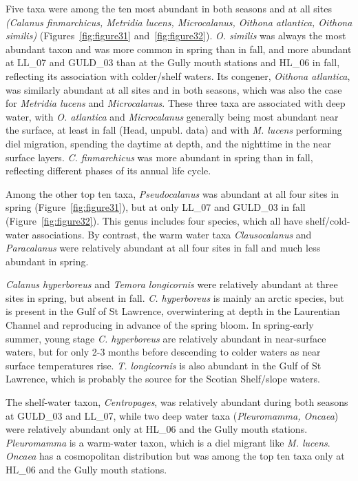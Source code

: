 \documentclass[12pt]{article}\usepackage[]{graphicx}\usepackage[]{color}
\begin{document}
Five taxa were among the ten most abundant in both seasons and at all sites \emph{(Calanus finmarchicus, Metridia lucens, Microcalanus, Oithona atlantica, Oithona similis)} (Figures~\ref{fig:figure31} and~\ref{fig:figure32}). \emph{O. similis} was always the most abundant taxon and was more common in spring than in fall, and more abundant at LL\_07 and GULD\_03 than at the Gully mouth stations and HL\_06 in fall, reflecting its association with colder/shelf waters. Its congener, \emph{Oithona atlantica}, was similarly abundant at all sites and in both seasons, which was also the case for \emph{Metridia lucens} and \emph{Microcalanus}. These three taxa are associated with deep water, with \emph{O. atlantica} and \emph{Microcalanus} generally being most abundant near the surface, at least in fall (Head, unpubl. data) and with \emph{M. lucens} performing diel migration, spending the daytime at depth, and the nighttime in the near surface layers. \emph{C. finmarchicus} was more abundant in spring than in fall, reflecting different phases of its annual life cycle.

Among the other top ten taxa, \emph{Pseudocalanus} was abundant at all four sites in spring (Figure~\ref{fig:figure31}), but at only LL\_07 and GULD\_03 in fall (Figure~\ref{fig:figure32}). This genus includes four species, which all have shelf/cold-water associations. By contrast, the warm water taxa \emph{Clausocalanus} and \emph{Paracalanus} were relatively abundant at all four sites in fall and much less abundant in spring.

\emph{Calanus hyperboreus} and \emph{Temora longicornis} were relatively abundant at three sites in spring, but absent in fall. \emph{C. hyperboreus} is mainly an arctic species, but is present in the Gulf of St Lawrence, overwintering at depth in the Laurentian Channel and reproducing in advance of the spring bloom. In spring-early summer, young stage \emph{C. hyperboreus} are relatively abundant in near-surface waters, but for only 2-3 months before descending to colder waters as near surface temperatures rise. \emph{T. longicornis} is also abundant in the Gulf of St Lawrence, which is probably the source for the Scotian Shelf/slope waters.

The shelf-water taxon, \emph{Centropages}, was relatively abundant during both seasons at GULD\_03 and LL\_07, while two deep water taxa (\emph{Pleuromamma, Oncaea}) were relatively abundant only at HL\_06 and the Gully mouth stations. \emph{Pleuromamma} is a warm-water taxon, which is a diel migrant like \emph{M. lucens}. \emph{Oncaea} has a cosmopolitan distribution but was among the top ten taxa only at HL\_06 and the Gully mouth stations.
\end{document}
